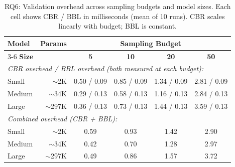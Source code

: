 \begin{table}[t]
\centering
\caption{RQ6: Validation overhead across sampling budgets and model sizes. Each cell shows CBR / BBL in milliseconds (mean of 10 runs). CBR scales linearly with budget; BBL is constant.}
\label{tab:rq6-overhead-full}
\small
\setlength{\tabcolsep}{5pt}
\begin{tabular}{l@{\hspace{8pt}}r@{\hspace{12pt}}cccc}
\toprule
\textbf{Model} & \textbf{Params} & \multicolumn{4}{c}{\textbf{Sampling Budget}} \\
\cmidrule(lr){3-6}
\textbf{Size} & & \textbf{5} & \textbf{10} & \textbf{20} & \textbf{50} \\
\midrule
\multicolumn{6}{l}{\textit{CBR overhead / BBL overhead (both measured at each budget):}} \\
Small   & $\sim$2K   & 0.50 / 0.09 & 0.85 / 0.09 & 1.34 / 0.09 & 2.81 / 0.09 \\
Medium  & $\sim$34K  & 0.29 / 0.13 & 0.58 / 0.13 & 1.16 / 0.13 & 2.84 / 0.13 \\
Large   & $\sim$297K & 0.36 / 0.13 & 0.73 / 0.13 & 1.44 / 0.13 & 3.59 / 0.13 \\
\midrule
\multicolumn{6}{l}{\textit{Combined overhead (CBR + BBL):}} \\
Small   & $\sim$2K   & 0.59 & 0.93 & 1.42 & 2.90 \\
Medium  & $\sim$34K  & 0.42 & 0.70 & 1.28 & 2.97 \\
Large   & $\sim$297K & 0.49 & 0.86 & 1.57 & 3.72 \\
\bottomrule
\end{tabular}
\end{table}

